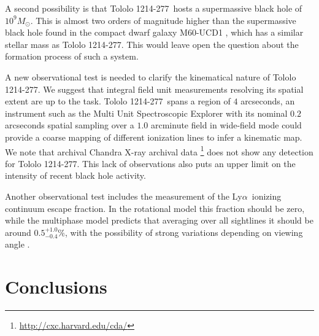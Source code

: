\documentclass[a4,useAMS,usenatbib,usegraphicx]{mn2e}
\newcommand{\tol}{Tololo 1214-277}
\newcommand{\lya}{Ly$\alpha$}
\newcommand{\kms}{km s$^{-1}$}
\begin{document}
A second possibility is that \tol\ hosts a supermassive black hole of
$10^{9} M_{\odot}$. This is almost two orders of magnitude higher
than the supermassive black hole found in the compact dwarf galaxy
M60-UCD1 \citep{2014Natur.513..398S}, which has a similar stellar mass
as \tol. This would leave open the question about the formation
process of such a system.   


A new observational test is needed to clarify the kinematical nature of
\tol. 
We suggest that integral field unit measurements 
resolving its spatial extent are up to the task. 
\tol\ spans a region of $4$ arcseconds,
an instrument such as the Multi Unit Spectroscopic Explorer
\citep{2014Msngr.157...13B} with its
nominal $0.2$ arcseconds spatial sampling over a $1.0$ arcminute field
in wide-field mode could provide a coarse mapping of different
ionization lines to infer a kinematic map.
We note that archival Chandra X-ray archival
data \footnote{\url{http://cxc.harvard.edu/cda/}} does not show any
detection for \tol. This lack of observations also puts an upper
limit on the intensity of recent black hole activity.

Another observational test includes the measurement of the
\lya\ ionizing continuum escape fraction.
In the rotational model this fraction should be zero, while
the multiphase model predicts that averaging over all sightlines
it should be around $0.5^{+1.0}_{-0.4}$\%, with the possibility of strong
variations depending on viewing angle \citep{Gronke2016}. 



\section{Conclusions}
\end{document}
